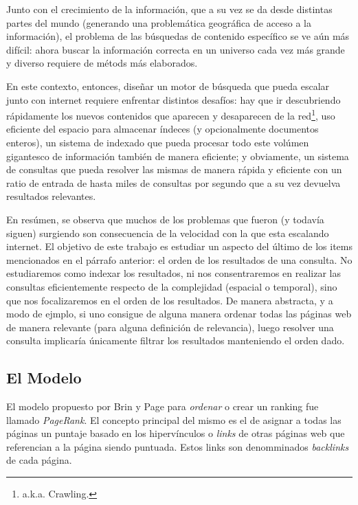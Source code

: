 \par Junto con el crecimiento de la informaci\'on, que a su vez se da desde
distintas partes del mundo (generando una problem\'atica geogr\'afica de acceso
a la informaci\'on), el problema de las b\'usquedas de contenido espec\'ifico se
ve a\'un m\'as dif\'icil: ahora buscar la informaci\'on correcta en un universo
cada vez m\'as grande y diverso requiere de m\'etods m\'as elaborados.

\par En este contexto, entonces, dise\~nar un motor de b\'usqueda que pueda
escalar junto con internet requiere enfrentar distintos desaf\'ios: hay que ir
descubriendo r\'apidamente los nuevos contenidos que aparecen y desaparecen de
la red\footnote{a.k.a. Crawling.}, uso eficiente del espacio para almacenar
\'indeces (y opcionalmente documentos enteros), un sistema de indexado que pueda
procesar todo este vol\'umen gigantesco de informaci\'on tambi\'en de manera
eficiente; y obviamente, un sistema de consultas que pueda resolver las mismas
de manera r\'apida y eficiente con un ratio de entrada de hasta miles de
consultas por segundo que a su vez devuelva resultados relevantes.

\par En res\'umen, se observa que muchos de los problemas que fueron (y todav\'ia
siguen) surgiendo son consecuencia de la velocidad con la que esta escalando
internet. El objetivo de este trabajo es estudiar un aspecto del \'ultimo de los
items mencionados en el p\'arrafo anterior: el orden de los resultados de una
consulta. No estudiaremos como indexar los resultados, ni nos consentraremos en
realizar las consultas eficientemente respecto de la complejidad (espacial o
temporal), sino que nos focalizaremos en el orden de los resultados. De manera
abstracta, y a modo de ejmplo, si uno consigue de alguna manera ordenar todas
las p\'aginas web de manera relevante (para alguna definici\'on de relevancia),
luego resolver una consulta implicar\'ia \'unicamente filtrar los resultados
manteniendo el orden dado.


\subsection{El Modelo}\label{subsec:intro_pagerank}
\par El modelo propuesto por Brin y Page para \emph{ordenar} o crear un ranking
fue llamado \emph{PageRank}. El concepto principal del mismo es el de asignar a
todas las p\'aginas un puntaje basado en los hiperv\'inculos o \emph{links} de
otras p\'aginas web que referencian a la p\'agina siendo puntuada. Estos links
son denomminados \emph{backlinks} de cada p\'agina.


